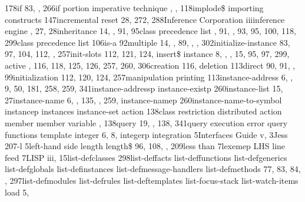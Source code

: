 \documentclass[letterpaper,10pt,english]{sphinxmanual}
\begin{document}
178if 83, , 266if portion imperative technique ,
, 118implode\$ importing constructs 147incremental reset
28, 272, 288Inference Corporation iiiinference engine , 27,
28inheritance 14, , 91, 95class precedence list , 91,
, 93, 95, 100, 118, 299class precedence list 106is-a 92multiple
14, , 89, , , 302initialize-instance 83, 97, 104, 112,
, 257init-slots 112, 121, 124, insert\$ instance
8, , , 15, 95, 97, 299, active , 116, 118,
125, 126, 257, 260, 306creation 116, deletion 113direct 90, 91,
, 99initialization 112, 120, 124, 257manipulation
printing 113instance-address 6, , 9, 50, 181, 258, 259,
341instance-addressp instance-existp 260instance-list 15,
27instance-name 6, , 135, , 259, instance-namep
260instance-name-to-symbol instancep instances
instance-set action 138class restriction
distributed action member member variable
, 138query 19, , 138, 341query execution error
query functions template integer 6, 8,
integerp integration 5Interfaces Guide v, 3Jess 207-l
5left-hand side length length\$ 96, 108, ,
209less than 7lexemep LHS line feed 7LISP iii,
15list-defclasses 298list-deffacts list-deffunctions
list-defgenerics list-defglobals
list-definstances list-defmessage-handlers
list-defmethods 77, 83, 84, , 297list-defmodules
list-defrules list-deftemplates
list-focus-stack list-watch-items load 5,
\end{document}
